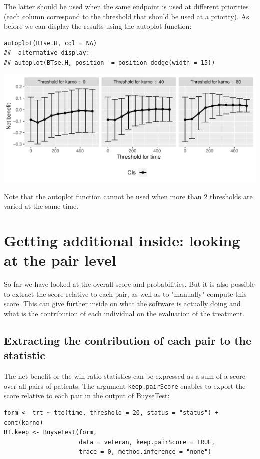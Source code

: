 \documentclass[12pt]{article}
\begin{document}
The latter should be used when the same endpoint is used at different
priorities (each column correspond to the threshold that should be
used at a priority). As before we can display the results using the
autoplot function:
\lstset{language=r,label= ,caption= ,captionpos=b,numbers=none}
\begin{lstlisting}
autoplot(BTse.H, col = NA)
##  alternative display:
## autoplot(BTse.H, position  = position_dodge(width = 15))
\end{lstlisting}

\begin{center}
\includegraphics[width=\textwidth]{./figures/gg-sensitivity2.pdf}
\end{center}

Note that the autoplot function cannot be used when more than 2
thresholds are varied at the same time.
\clearpage

\section{Getting additional inside: looking at the pair level}
\label{sec:org1471139}

So far we have looked at the overall score and probabilities. But it
is also possible to extract the score relative to each pair, as well
as to "manually" compute this score. This can give further inside on
what the software is actually doing and what is the contribution of
each individual on the evaluation of the treatment.

\subsection{Extracting the contribution of each pair to the statistic}
\label{sec:org28a33a5}
The net benefit or the win ratio statistics can be expressed as a sum
of a score over all pairs of patients. The argument \texttt{keep.pairScore}
enables to export the score relative to each pair in the output of
BuyseTest:
\lstset{language=r,label= ,caption= ,captionpos=b,numbers=none}
\begin{lstlisting}
form <- trt ~ tte(time, threshold = 20, status = "status") + cont(karno)
BT.keep <- BuyseTest(form,
                     data = veteran, keep.pairScore = TRUE, 
                     trace = 0, method.inference = "none")
\end{lstlisting}
\end{document}
